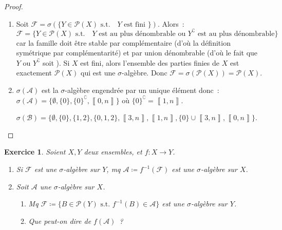 \documentclass{article}
\newtheorem{ex}{Exercice}[section]
\theoremstyle{definition}
\newcommand{\st}{\text{ s.t. }}
\newcommand{\C}{\complement}
\newcommand{\intint}[2]{\left\llbracket#1, #2\right\rrbracket}
\begin{document}
\begin{proof}~
\begin{enumerate}
	\item Soit $\mathcal F = \sigma(\{Y \in \mathcal P(X) \st \text{ $Y$ est fini }\})$. Alors~:
	\[\mathcal F = \{Y \in \mathcal P(X) \st \text{ $Y$ est au plus dénombrable ou $Y^\C$ est au plus dénombrable}\}\]
	car la famille doit être stable par complémentaire (d'où la définition symétrique par complémentarité) et par union dénombrable (d'où le fait
	que $Y$ ou $Y^\C$ soit ). Si $X$ est fini, alors l'ensemble des parties finies de $X$ est exactement $\mathcal P(X)$
	qui est une $\sigma$-algèbre. Donc $\mathcal F = \sigma(\mathcal P(X)) = \mathcal P(X)$.
	\item $\sigma(\mathcal A)$ est la $\sigma$-algèbre engendrée par un unique élément donc~: $\sigma(\mathcal A) = \{\emptyset, \{0\}, \{0\}^\C, \intint 0n\}$
	où $\{0\}^\C = \intint 1n$.

	$\sigma(\mathcal B) = \{\emptyset, \{0\}, \{1, 2\}, \{0, 1, 2\}, \intint 3n, \intint 1n, \{0\} \cup \intint 3n, \intint 0n\}$.
\end{enumerate}
\end{proof}

\begin{ex} Soient $X, Y$ deux ensembles, et $f : X \to Y$.
\begin{enumerate}
	\item Si $\mathcal F$ est une $\sigma$-algèbre sur $Y$, mq $\mathcal A \coloneqq f^{-1}(\mathcal F)$ est une $\sigma$-algèbre sur $X$.
	\item Soit $\mathcal A$ une $\sigma$-algèbre sur $X$.
	\begin{enumerate}
		\item Mq $\mathcal F \coloneqq \{B \in \mathcal P(Y) \st f^{-1}(B) \in \mathcal A\}$ est une $\sigma$-algèbre sur $Y$.
		\item Que peut-on dire de $f(\mathcal A)$~?
	\end{enumerate}
\end{enumerate}
\end{ex}
\end{document}
